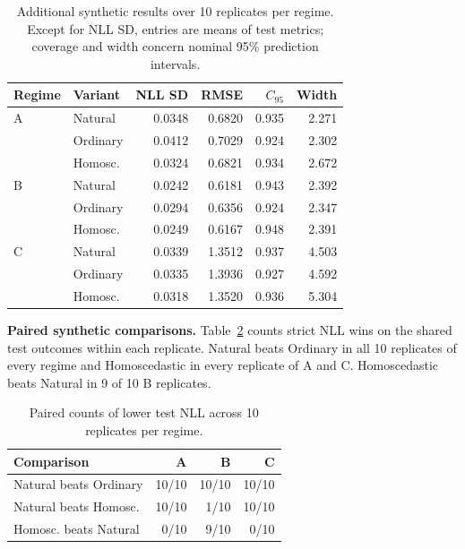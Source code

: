 \begin{table}[t]
\centering
\footnotesize
\setlength{\tabcolsep}{3pt}
\begin{tabular}{@{}llrrrr@{}}
\toprule
Regime & Variant & NLL SD & RMSE & $C_{95}$ & Width \\
\midrule
A & Natural & 0.0348 & 0.6820 & 0.935 & 2.271 \\
& Ordinary & 0.0412 & 0.7029 & 0.924 & 2.302 \\
& Homosc. & 0.0324 & 0.6821 & 0.934 & 2.672 \\
\midrule
B & Natural & 0.0242 & 0.6181 & 0.943 & 2.392 \\
& Ordinary & 0.0294 & 0.6356 & 0.924 & 2.347 \\
& Homosc. & 0.0249 & 0.6167 & 0.948 & 2.391 \\
\midrule
C & Natural & 0.0339 & 1.3512 & 0.937 & 4.503 \\
& Ordinary & 0.0335 & 1.3936 & 0.927 & 4.592 \\
& Homosc. & 0.0318 & 1.3520 & 0.936 & 5.304 \\
\bottomrule
\end{tabular}
\caption{Additional synthetic results over 10 replicates per regime.
Except for NLL SD, entries are means of test metrics; coverage and width concern nominal 95\% prediction intervals.}
\label{tab:synthetic-additional}
\end{table}

\textbf{Paired synthetic comparisons.}
Table~\ref{tab:synthetic-paired-counts} counts strict NLL wins on the shared test outcomes within each replicate.
Natural beats Ordinary in all 10 replicates of every regime and Homoscedastic in every replicate of A and C.
Homoscedastic beats Natural in 9 of 10 B replicates.

\begin{table}[t]
\centering
\small
\setlength{\tabcolsep}{4pt}
\begin{tabular}{@{}lrrr@{}}
\toprule
Comparison & A & B & C \\
\midrule
Natural beats Ordinary & 10/10 & 10/10 & 10/10 \\
Natural beats Homosc. & 10/10 & 1/10 & 10/10 \\
Homosc. beats Natural & 0/10 & 9/10 & 0/10 \\
\bottomrule
\end{tabular}
\caption{Paired counts of lower test NLL across 10 replicates per regime.}
\label{tab:synthetic-paired-counts}
\end{table}

